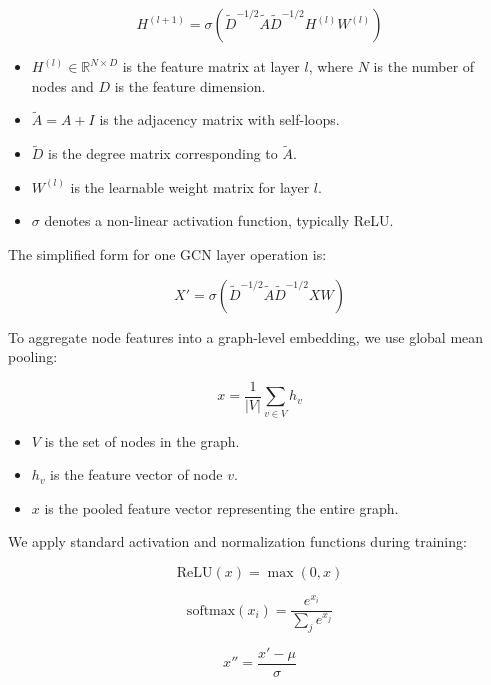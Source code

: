 \begin{equation}
	H^{(l+1)} = \sigma\left(\tilde{D}^{-1/2} \tilde{A} \tilde{D}^{-1/2} H^{(l)} W^{(l)}\right)
\end{equation}

\begin{itemize}
	\item $H^{(l)} \in \mathbb{R}^{N \times D}$ is the feature matrix at layer $l$, where $N$ is the number of nodes and $D$ is the feature dimension.
	\item $\tilde{A} = A + I$ is the adjacency matrix with self-loops.
	\item $\tilde{D}$ is the degree matrix corresponding to $\tilde{A}$.
	\item $W^{(l)}$ is the learnable weight matrix for layer $l$.
	\item $\sigma$ denotes a non-linear activation function, typically ReLU.
\end{itemize}

The simplified form for one GCN layer operation is:

\begin{equation}
	X' = \sigma\left(\tilde{D}^{-1/2} \tilde{A} \tilde{D}^{-1/2} X W\right)
\end{equation}

To aggregate node features into a graph-level embedding, we use global mean pooling:

\begin{equation}
	x = \frac{1}{|V|} \sum_{v \in V} h_v
\end{equation}

\begin{itemize}
	\item $V$ is the set of nodes in the graph.
	\item $h_v$ is the feature vector of node $v$.
	\item $x$ is the pooled feature vector representing the entire graph.
\end{itemize}

We apply standard activation and normalization functions during training:

\begin{equation}
	\text{ReLU}(x) = \max(0, x)
\end{equation}

\begin{equation}
	\text{softmax}(x_i) = \frac{e^{x_i}}{\sum_j e^{x_j}}
\end{equation}

\begin{equation}
	x'' = \frac{x' - \mu}{\sigma}
\end{equation}

